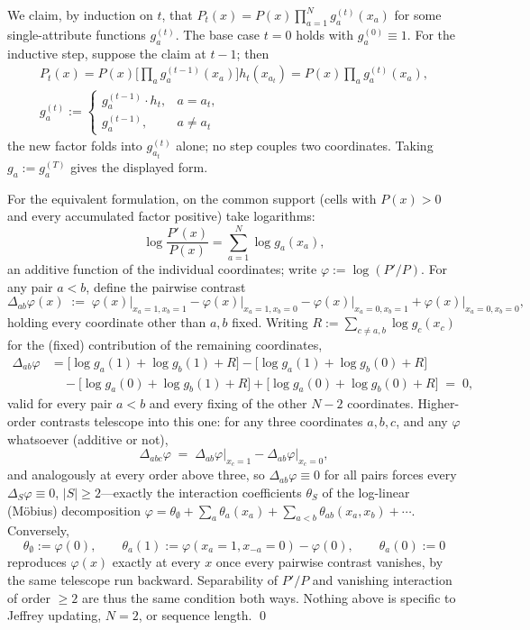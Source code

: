 \documentclass[a4paper,fleqn]{cas-sc}
\theoremstyle{remark}
\theoremstyle{definition}
\begin{document}
We claim, by induction on $t$, that
$P_{t}(x)=P(x)\prod_{a=1}^{N}g^{(t)}_{a}(x_{a})$ for some single-attribute functions
$g^{(t)}_{a}$. The base case $t=0$ holds with $g^{(0)}_{a}\equiv1$. For the inductive step,
suppose the claim at $t-1$; then
\[
\begin{gathered}
  P_{t}(x)
  =P(x)\Big[\prod_{a}g^{(t-1)}_{a}(x_{a})\Big]h_{t}(x_{a_{t}})
  =P(x)\prod_{a}g^{(t)}_{a}(x_{a}),
  \\[4pt]
  g^{(t)}_{a}:=
  \begin{cases}
    g^{(t-1)}_{a}\cdot h_{t}, & a=a_{t},\\[2pt]
    g^{(t-1)}_{a}, & a\neq a_{t}
  \end{cases}
\end{gathered}
\]
the new factor folds into $g^{(t)}_{a_t}$ alone; no step couples two coordinates. Taking
$g_{a}:=g^{(T)}_{a}$ gives the displayed form.

For the equivalent formulation, on the common support (cells with $P(x)>0$ and every
accumulated factor positive) take logarithms:
\[
  \log\frac{P'(x)}{P(x)}=\sum_{a=1}^{N}\log g_{a}(x_{a}),
\]
an additive function of the individual coordinates; write $\varphi:=\log(P'/P)$. For any pair
$a<b$, define the pairwise contrast
\[
  \Delta_{ab}\varphi(x)\;:=\;\varphi(x)\big|_{x_{a}=1,x_{b}=1}-\varphi(x)\big|_{x_{a}=1,x_{b}=0}
  -\varphi(x)\big|_{x_{a}=0,x_{b}=1}+\varphi(x)\big|_{x_{a}=0,x_{b}=0},
\]
holding every coordinate other than $a,b$ fixed. Writing $R:=\sum_{c\neq a,b}\log g_{c}(x_{c})$
for the (fixed) contribution of the remaining coordinates,
\begin{align*}
  \Delta_{ab}\varphi
  &=\bigl[\log g_{a}(1)+\log g_{b}(1)+R\bigr]-\bigl[\log g_{a}(1)+\log g_{b}(0)+R\bigr]\\
  &\quad-\bigl[\log g_{a}(0)+\log g_{b}(1)+R\bigr]+\bigl[\log g_{a}(0)+\log g_{b}(0)+R\bigr]
  \;=\;0,
\end{align*}
valid for every pair $a<b$ and every fixing of the other $N-2$ coordinates. Higher-order
contrasts telescope into this one: for any three coordinates $a,b,c$, and any $\varphi$
whatsoever (additive or not),
\[
  \Delta_{abc}\varphi \;=\; \Delta_{ab}\varphi\big|_{x_{c}=1}-\Delta_{ab}\varphi\big|_{x_{c}=0},
\]
and analogously at every order above three, so $\Delta_{ab}\varphi\equiv0$ for all pairs forces
every $\Delta_{S}\varphi\equiv0$, $|S|\ge2$---exactly the interaction coefficients $\theta_{S}$
of the log-linear (M\"obius) decomposition
$\varphi=\theta_{\emptyset}+\sum_{a}\theta_{a}(x_{a})+\sum_{a<b}\theta_{ab}(x_{a},x_{b})
+\cdots$. Conversely,
\[
  \theta_{\emptyset}:=\varphi(0),\qquad
  \theta_{a}(1):=\varphi(x_{a}{=}1,x_{-a}{=}0)-\varphi(0),\qquad \theta_{a}(0):=0
\]
reproduces $\varphi(x)$ exactly at every $x$ once every pairwise contrast vanishes, by the same
telescope run backward. Separability of $P'/P$ and vanishing interaction of order $\ge2$ are
thus the same condition both ways. Nothing above is specific to Jeffrey updating, $N=2$, or
sequence length.
\qed
\end{document}
